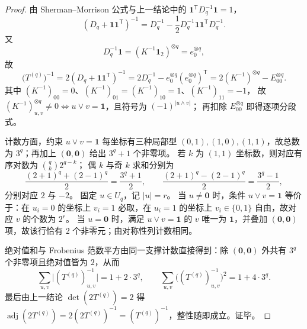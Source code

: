 \begin{proof}
由 Sherman--Morrison 公式与上一结论中的
\(
\mathbf 1^{\mathsf T}D_q^{-1}\mathbf 1=1
\)，
\[
(D_q+\mathbf 1\mathbf 1^{\mathsf T})^{-1}
=D_q^{-1}-\frac12D_q^{-1}\mathbf 1\mathbf 1^{\mathsf T}D_q^{-1}.
\]
又
\[
D_q^{-1}\mathbf 1
=(K^{-1}\mathbf 1_2)^{\otimes q}
=e_0^{\otimes q},
\]
故
\[
\bigl(T^{(q)}\bigr)^{-1}
=2(D_q+\mathbf 1\mathbf 1^{\mathsf T})^{-1}
=2D_q^{-1}-e_0^{\otimes q}(e_0^{\otimes q})^{\mathsf T}
=2(K^{-1})^{\otimes q}-E_{00}^{\otimes q}.
\]
其中 \((K^{-1})_{00}=0\)、\((K^{-1})_{01}=(K^{-1})_{10}=1\)、\((K^{-1})_{11}=-1\)，
故 \((K^{-1})^{\otimes q}_{u,v}\neq 0\iff u\vee v=\mathbf 1\)，且符号为 \((-1)^{|u\wedge v|}\)；
再扣除 \(E_{00}^{\otimes q}\) 即得逐项分段式。
\par
计数方面，约束 \(u\vee v=\mathbf 1\) 每坐标有三种局部型 \((0,1),(1,0),(1,1)\)，故总数为 \(3^q\)；再加上 \((\mathbf 0,\mathbf 0)\) 给出 \(3^q+1\) 个非零项。
若 \(k\) 为 \((1,1)\) 坐标数，则对应有序对数为 \(\binom{q}{k}2^{q-k}\)；
偶 \(k\) 与奇 \(k\) 求和分别为
\[
\frac{(2+1)^q+(2-1)^q}{2}=\frac{3^q+1}{2},
\qquad
\frac{(2+1)^q-(2-1)^q}{2}=\frac{3^q-1}{2},
\]
分别对应 \(2\) 与 \(-2\)。
固定 \(u\in U_q\)，记 \(|u|=r\)。
当 \(u\neq \mathbf 0\) 时，条件 \(u\vee v=\mathbf 1\) 等价于：在 \(u_i=0\) 的坐标上 \(v_i=1\) 必取，在 \(u_i=1\) 的坐标上 \(v_i\in\{0,1\}\) 自由，故对应 \(v\) 的个数为 \(2^r\)。
当 \(u=\mathbf 0\) 时，满足 \(u\vee v=\mathbf 1\) 的 \(v\) 唯一为 \(\mathbf 1\)，并叠加 \((\mathbf 0,\mathbf 0)\) 项，故该行恰有 \(2\) 个非零元；由对称性列计数相同。
\par
绝对值和与 Frobenius 范数平方由同一支撑计数直接得到：除 \((\mathbf 0,\mathbf 0)\) 外共有 \(3^q\) 个非零项且绝对值皆为 \(2\)，从而
\[
\sum_{u,v}\bigl|(T^{(q)})^{-1}_{u,v}\bigr|=1+2\cdot 3^q,
\qquad
\sum_{u,v}\bigl((T^{(q)})^{-1}_{u,v}\bigr)^2=1+4\cdot 3^q.
\]
最后由上一结论 \(\det(2T^{(q)})=2\) 得
\(
\operatorname{adj}(2T^{(q)})=2(2T^{(q)})^{-1}=(T^{(q)})^{-1}
\)，整性随即成立。证毕。
\end{proof}

